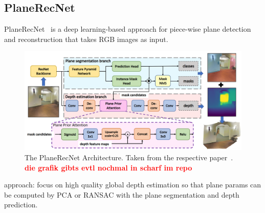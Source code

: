 \documentclass[main.tex]{subfiles}
\begin{document}
\subsection{PlaneRecNet}
PlaneRecNet~\cite{Xie_Shu_Rambach_Pagani_Stricker_2022} is a deep learning-based approach for piece-wise plane detection and reconstruction that takes RGB images 
as input.
\begin{figure}[H]
    \centering
    \includegraphics[width=\textwidth]{images/planerecnet.png}
    \caption[PlaneRecNet Architecture]{The PlaneRecNet Architecture. Taken from the respective paper~\cite{Xie_Shu_Rambach_Pagani_Stricker_2022}. 
    \textbf{\textcolor{red}{die grafik gibts evtl nochmal in scharf im repo}}}
\end{figure}

approach: 
focus on high quality global depth estimation so that plane params can be computed by PCA or RANSAC with the plane 
segmentation and depth prediction. 
\end{document}
